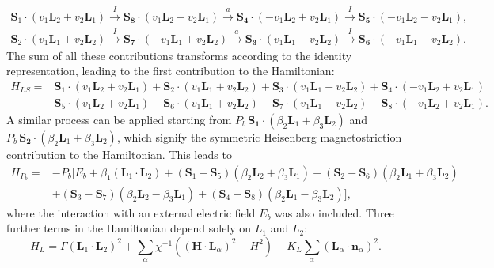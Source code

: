 \begin{align}
	\mathbf{S}_1\cdot(v_1 \mathbf{L}_2 + v_2 \mathbf{L}_1) \xrightarrow{I} \mathbf{S_8}\cdot(v_1 \mathbf{L}_2 - v_2 \mathbf{L}_1) \xrightarrow{a} \mathbf{S_4} \cdot (- v_1 \mathbf{L}_2 + v_2 \mathbf{L}_1) \xrightarrow{I} \mathbf{S_5} \cdot (-v_1 \mathbf{L}_2 - v_2 \mathbf{L}_1), \nonumber\\
	\mathbf{S}_2\cdot(v_1 \mathbf{L}_1 + v_2 \mathbf{L}_2) \xrightarrow{I} \mathbf{S_7}\cdot(-v_1 \mathbf{L}_1 + v_2 \mathbf{L}_2) \xrightarrow{a} \mathbf{S_3} \cdot (v_1 \mathbf{L}_1 - v_2 \mathbf{L}_2) \xrightarrow{I} \mathbf{S_6} \cdot (-v_1 \mathbf{L}_1 - v_2 \mathbf{L}_2).
\end{align}
The sum of all these contributions transforms according to the identity representation, leading to the first contribution to the Hamiltonian:
\begin{align}
    H_{LS} =& \mathbf{S}_1 \cdot (v_1 \mathbf{L}_2 + v_2 \mathbf{L}_1) + \mathbf{S}_2 \cdot (v_1 \mathbf{L}_1 + v_2 \mathbf{L}_2) + \mathbf{S}_3 \cdot (v_1 \mathbf{L}_1 - v_2 \mathbf{L}_2) + \mathbf{S}_4 \cdot (-v_1 \mathbf{L}_2 + v_2 \mathbf{L}_1) \nonumber\\
    -&\mathbf{S}_5 \cdot (v_1 \mathbf{L}_2 + v_2 \mathbf{L}_1) - \mathbf{S}_6 \cdot (v_1 \mathbf{L}_1 + v_2 \mathbf{L}_2) - \mathbf{S}_7 \cdot (v_1 \mathbf{L}_1 - v_2 \mathbf{L}_2) - \mathbf{S}_8 \cdot (-v_1 \mathbf{L}_2 + v_2 \mathbf{L}_1).
\end{align}
A similar process can be applied starting from $P_b \, \mathbf{S_1}\cdot(\beta_2 \mathbf{L}_1 + \beta_3 \mathbf{L}_2)$ and $P_b\, \mathbf{S_2}\cdot(\beta_2 \mathbf{L}_1 + \beta_3 \mathbf{L}_2)$, which signify the symmetric Heisenberg magnetostriction contribution to the Hamiltonian. This leads to
\begin{align}
	H_{P_b}=&-P_b[E_b + \beta_1 (\mathbf{L}_1\cdot \mathbf{L}_2)+
    (\mathbf{S}_1-\mathbf{S}_5)(\beta_2 \mathbf{L}_2 + \beta_3 \mathbf{L}_1) +
    (\mathbf{S}_2-\mathbf{S}_6)(\beta_2 \mathbf{L}_1 + \beta_3 \mathbf{L}_2) \nonumber\\ 
    &+(\mathbf{S}_3-\mathbf{S}_7)(\beta_2 \mathbf{L}_2 - \beta_3 \mathbf{L}_1) +
    (\mathbf{S}_4-\mathbf{S}_8)(\beta_2 \mathbf{L}_1 - \beta_3 \mathbf{L}_2)],
\end{align}
where the interaction with an external electric field $E_b$ was also included. 
Three further terms in the Hamiltonian depend solely on $L_1$ and $L_2$:
\begin{equation}
	H_L = \Gamma(\mathbf{L}_1\cdot \mathbf{L}_2)^2
    +\sum_{\alpha}\chi^{-1}((\mathbf{H}\cdot \mathbf{L}_\alpha)^2-H^2)
    -K_L\sum_\alpha(\mathbf{L}_\alpha\cdot \mathbf{n}_\alpha)^2\label{eq:GdMn2O5_hami_1}.
\end{equation}
